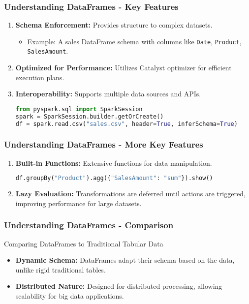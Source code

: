 \documentclass[aspectratio=169]{beamer}
\begin{document}
\begin{frame}[fragile]
    \frametitle{Understanding DataFrames - Key Features}
    \begin{enumerate}
        \item \textbf{Schema Enforcement:} Provides structure to complex datasets.
            \begin{itemize}
                \item Example: A sales DataFrame schema with columns like \texttt{Date}, \texttt{Product}, \texttt{SalesAmount}.
            \end{itemize}
        \item \textbf{Optimized for Performance:} Utilizes Catalyst optimizer for efficient execution plans.
        \item \textbf{Interoperability:} Supports multiple data sources and APIs.
            \begin{lstlisting}[language=Python]
from pyspark.sql import SparkSession
spark = SparkSession.builder.getOrCreate()
df = spark.read.csv("sales.csv", header=True, inferSchema=True)
            \end{lstlisting}
    \end{enumerate}
\end{frame}

\begin{frame}[fragile]
    \frametitle{Understanding DataFrames - More Key Features}
    \begin{enumerate}[resume]
        \item \textbf{Built-in Functions:} Extensive functions for data manipulation.
            \begin{lstlisting}[language=Python]
df.groupBy("Product").agg({"SalesAmount": "sum"}).show()
            \end{lstlisting}
        \item \textbf{Lazy Evaluation:} Transformations are deferred until actions are triggered, improving performance for large datasets.
    \end{enumerate}
\end{frame}

\begin{frame}[fragile]
    \frametitle{Understanding DataFrames - Comparison}
    \begin{block}{Comparing DataFrames to Traditional Tabular Data}
        \begin{itemize}
            \item \textbf{Dynamic Schema:} DataFrames adapt their schema based on the data, unlike rigid traditional tables.
            \item \textbf{Distributed Nature:} Designed for distributed processing, allowing scalability for big data applications.
        \end{itemize}
    \end{block}
\end{frame}
\end{document}
